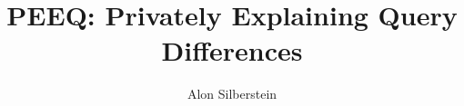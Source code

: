 \documentclass[sigconf, nonacm]{acmart}
\newif\ifrevisionletter
\theoremstyle{acmdefinition}
\theoremstyle{acmdefinition}
\begin{document}

\ifrevisionletter

\fi

\title{PEEQ: Privately Explaining Query Differences}




\author{Alon Silberstein}



\end{document}
